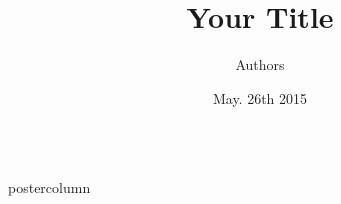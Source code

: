 \documentclass[final]{beamer}
\title{\huge Your Title }
\author{Authors }
\institute[Univerist\'e de Bourgogne]{Institute and Universities }
\date[May. 26th 2015]{May. 26th 2015}
\newlength{\columnheight}
\begin{document}
\begin{frame}
  \begin{columns}
    
    \begin{column}{.49\textwidth}
      \begin{beamercolorbox}[center,wd=\textwidth]{postercolumn}
        \begin{minipage}[T]{.95\textwidth}  %
          \parbox[t][\columnheight]{\textwidth}{ %

}
\end{minipage}
\end{beamercolorbox}
\end{column}
\end{columns}
\end{frame}
\end{document}
